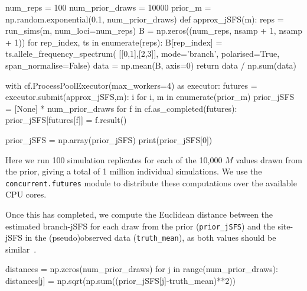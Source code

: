 \documentclass[graybox]{svmult}
\begin{document}
\begin{pythoncode}
num_reps = 100
num_prior_draws = 10000
prior_m = np.random.exponential(0.1, num_prior_draws)
def approx_jSFS(m):
    reps = run_sims(m, num_loci=num_reps)
    B = np.zeros((num_reps, nsamp + 1, nsamp + 1))
    for rep_index, ts in enumerate(reps):
        B[rep_index] = ts.allele_frequency_spectrum(
            [[0,1],[2,3]], mode='branch',
            polarised=True, span_normalise=False)
    data = np.mean(B, axis=0)
    return data / np.sum(data)

with cf.ProcessPoolExecutor(max_workers=4) as executor:
    futures = {executor.submit(approx_jSFS,m): i
        for i, m in enumerate(prior_m)}
    prior_jSFS = [None] * num_prior_draws
    for f in cf.as_completed(futures):
        prior_jSFS[futures[f]] = f.result()

prior_jSFS = np.array(prior_jSFS)
print(prior_jSFS[0])
\end{pythoncode}

Here we run 100 simulation replicates for each of the 10,000
\(M\) values drawn from the prior, giving a total of 1 million individual simulations.
We use the \texttt{concurrent.futures} module to distribute these
computations over the available CPU cores.

Once this has completed, we compute the Euclidean distance between the estimated branch-jSFS for each
draw from the prior (\texttt{prior\_jSFS}) and the site-jSFS in the (pseudo)observed
data (\texttt{truth\_mean}), as both values should be
similar~\citep{ralph2020efficiently}.
\begin{pythoncode}
distances = np.zeros(num_prior_draws)
for j in range(num_prior_draws):
    distances[j] = np.sqrt(np.sum((prior_jSFS[j]-truth_mean)**2))
\end{pythoncode}


\end{document}
